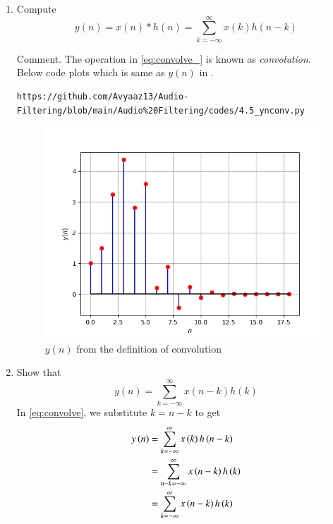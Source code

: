 \documentclass[journal,12pt,twocolumn]{IEEEtran}
\theoremstyle{remark}
\renewcommand\thesection{\arabic{section}}
\numberwithin{equation}{subsection}
\begin{document}
\begin{enumerate}[label=\thesection.\arabic*]
\item Compute 
\begin{equation}
\label{eq:convolve_}
y(n) = x(n)*h(n) = \sum_{k=-\infty}^{\infty}x(k)h(n-k)
\end{equation}

Comment. The operation in \eqref{eq:convolve_} is known as
{\em convolution}.
%
\\
\solution Below code plots  which is same as 
$y(n)$ in
. 

\begin{lstlisting}
https://github.com/Avyaaz13/Audio-Filtering/blob/main/Audio%20Filtering/codes/4.5_ynconv.py
\end{lstlisting}
\begin{figure}[!ht]
\centering
\includegraphics[width=\columnwidth]{figs/y_by_conv.png}
\caption{$y(n)$ from the definition of convolution}
\label{fig:ynconv_1}
\end{figure}

\item Show that
\begin{equation}
y(n) =  \sum_{k=-\infty}^{\infty}x(n-k)h(k)
\end{equation}
\solution
In \eqref{eq:convolve}, we substitute $k = n - k$ to get
\begin{align}
y\left(n\right) &= \sum_{k=-\infty}^{\infty}x\left(k\right)h\left(n - k\right) \\
		  &= \sum_{n - k=-\infty}^{\infty}x\left(n - k\right)h\left(k\right) \\
		  &= \sum_{k=-\infty}^{\infty}x\left(n - k\right)h\left(k\right)
\end{align}
\end{enumerate}
\end{document}
